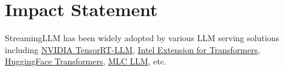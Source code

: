 \section*{Impact Statement} StreamingLLM has been widely adopted by various LLM serving solutions including \href{https://github.com/NVIDIA/TensorRT-LLM/tree/main/examples/llama#run-llama-with-streamingllm}{NVIDIA TensorRT-LLM}, \href{https://github.com/intel/intel-extension-for-transformers}{Intel Extension for Transformers}, \href{https://huggingface.co/docs/transformers/v4.39.3/en/internal/generation_utils#transformers.SinkCache}{HuggingFace Transformers}, \href{https://github.com/mlc-ai/mlc-llm/pull/1459}{MLC LLM}, etc.


